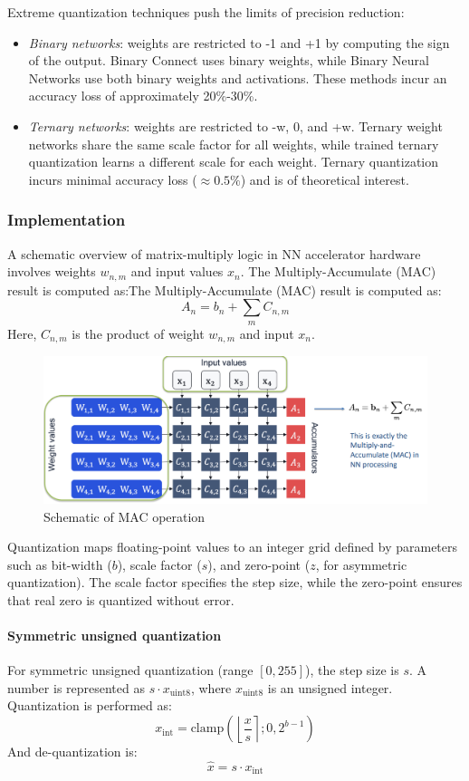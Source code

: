 Extreme quantization techniques push the limits of precision reduction:
\begin{itemize}
    \item \textit{Binary networks}: weights are restricted to -1 and +1 by computing the sign of the output. 
        Binary Connect uses binary weights, while Binary Neural Networks use both binary weights and activations. 
        These methods incur an accuracy loss of approximately 20\%-30\%.
    \item \textit{Ternary networks}: weights are restricted to -w, 0, and +w. 
        Ternary weight networks share the same scale factor for all weights, while trained ternary quantization learns a different scale for each weight. 
        Ternary quantization incurs minimal accuracy loss ($\approx0.5\%$) and is of theoretical interest.
\end{itemize}


\subsubsection{Implementation}
A schematic overview of matrix-multiply logic in NN accelerator hardware involves weights $w_{n,m}$ and input values $x_n$.
The Multiply-Accumulate (MAC) result is computed as:The Multiply-Accumulate (MAC) result is computed as:
\[A_n=b_n+\sum_mC_{n,m}\] 
Here, $C_{n,m}$ is the product of weight $w_{n,m}$ and input $x_n$. 
\begin{figure}[H]
    \centering
    \includegraphics[width=0.75\linewidth]{images/eeai9.png}
    \caption{Schematic of MAC operation}
\end{figure}
Quantization maps floating-point values to an integer grid defined by parameters such as bit-width ($b$), scale factor ($s$), and zero-point ($z$, for asymmetric quantization).
The scale factor specifies the step size, while the zero-point ensures that real zero is quantized without error.

\paragraph*{Symmetric unsigned quantization}
For symmetric unsigned quantization (range $[0,255]$), the step size is $s$. 
A number is represented as $s\cdot x_{\text{uint8}}$, where $x_{\text{uint8}}$ is an unsigned integer. 
Quantization is performed as:
\[x_{\text{int}}=\text{clamp}\left(\left\lfloor \dfrac{x}{s}\right\rceil;0,2^{b-1} \right)\]
\noindent And de-quantization is:
\[\hat{x}=s\cdot x_{\text{int}}\]

